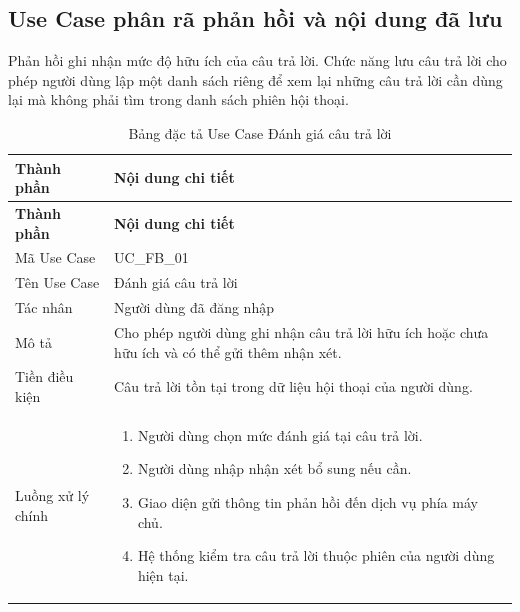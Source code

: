 \documentclass[12pt,a4paper,oneside]{report}
\begin{document}
\subsection{Use Case phân rã phản hồi và nội dung đã lưu}
Phản hồi ghi nhận mức độ hữu ích của câu trả lời. Chức năng lưu câu trả lời cho phép người dùng lập một danh sách riêng để xem lại những câu trả lời cần dùng lại mà không phải tìm trong danh sách phiên hội thoại.
{
  \begin{longtable}{|L{3.6cm}|L{11.2cm}|}
    \caption{Bảng đặc tả Use Case Đánh giá câu trả lời}\label{tab:uc-feedback}                                          \\
    \hline
    \textbf{Thành phần} & \textbf{Nội dung chi tiết}                                                                      \\
    \hline
    \endfirsthead
    \hline
    \textbf{Thành phần} & \textbf{Nội dung chi tiết}                                                                      \\
    \hline
    \endhead
    Mã Use Case       & UC\_FB\_01                                                                                      \\
    \hline
    Tên Use Case      & Đánh giá câu trả lời                                                                            \\
    \hline
    Tác nhân            & Người dùng đã đăng nhập                                                                         \\
    \hline
    Mô tả               & Cho phép người dùng ghi nhận câu trả lời hữu ích hoặc chưa hữu ích và có thể gửi thêm nhận xét. \\
    \hline
    Tiền điều kiện      & Câu trả lời tồn tại trong dữ liệu hội thoại của người dùng.                                     \\
    \hline
    Luồng xử lý chính   & \begin{enumerate}[leftmargin=*,nosep]
                            \item Người dùng chọn mức đánh giá tại câu trả lời.
                            \item Người dùng nhập nhận xét bổ sung nếu cần.
                            \item Giao diện gửi thông tin phản hồi đến dịch vụ phía máy chủ.
                            \item Hệ thống kiểm tra câu trả lời thuộc phiên của người dùng hiện tại.

\end{enumerate}
\end{longtable}}
\end{document}
